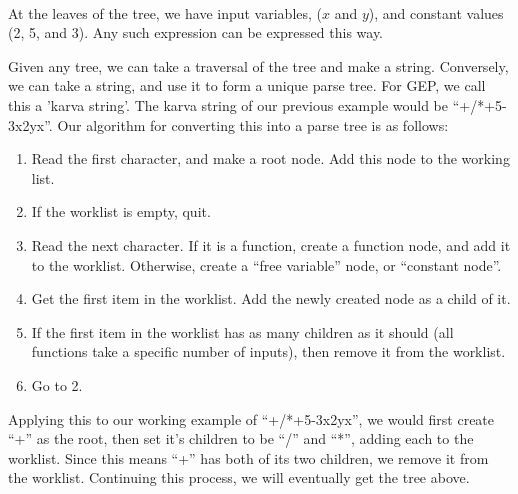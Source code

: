 \documentclass[a4paper,11pt]{report}
\begin{document}
\\[0.8cm]

At the leaves of the tree, we have input variables, ($x$ and $y$), and constant values (2, 5, and 3). Any 
such expression can be expressed this way. 

Given any tree, we can take a traversal of the tree and make a string. Conversely, we can take a string, 
and use it to form a unique parse tree. For GEP, we call this a 'karva string'. The karva string of our 
previous example would be ``+/*+5-3x2yx''. Our algorithm for converting this into a parse tree is as follows:

\begin{enumerate}
 \item Read the first character, and make a root node. Add this node to the working list.
 \item If the worklist is empty, quit. 
 \item Read the next character. If it is a function, create a function node, and add it to the worklist. 
      Otherwise, create a ``free variable'' node, or ``constant node''.
 \item Get the first item in the worklist. Add the newly created node as a child of it.
 \item If the first item in the worklist has as many children as it should (all functions take a specific number of 
       inputs), then remove it from the worklist. 
 \item Go to 2.
\end{enumerate}

Applying this to our working example of ``+/*+5-3x2yx'', we would first create ``+'' as the root, then set it's 
children to be ``/'' and ``*'', adding each to the worklist. Since this means ``+'' has both of its 
two children, we remove it from the worklist. Continuing this process, we will eventually get the 
tree above. 
\end{document}
